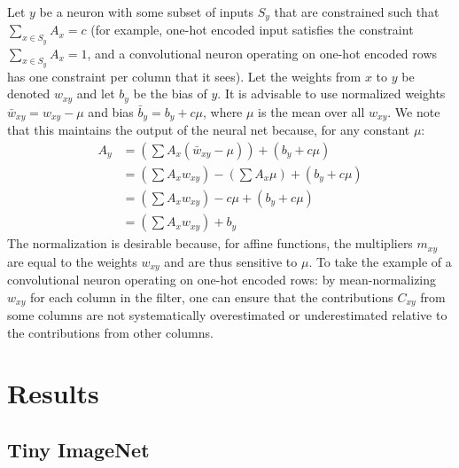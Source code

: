 \documentclass{article}
\begin{document}
Let $y$ be a neuron with some subset of inputs $S_y$ that are constrained such that $\sum_{x \in S_y} A_x=c$ (for example, one-hot encoded input satisfies the constraint $\sum_{x \in S_y} A_x = 1$, and a convolutional neuron operating on one-hot encoded rows has one constraint per column that it sees). Let the weights from $x$ to $y$ be denoted $w_{xy}$ and let $b_y$ be the bias of $y$. It is advisable to use normalized weights $\bar{w}_{xy} = w_{xy} - \mu$ and bias $\bar{b}_y = b_y + c\mu$, where $\mu$ is the mean over all $w_{xy}$. We note that this maintains the output of the neural net because, for any constant $\mu$:
\begin{equation}
\begin{aligned}
A_y &= \left(\sum A_x (\bar{w}_{xy} - \mu) \right) + (b_y + c\mu)\\
	&= \left(\sum A_x w_{xy}\right) - \left(\sum A_x \mu\right) + (b_y + c\mu)\\
    &= \left(\sum A_x w_{xy}\right) - c\mu + (b_y + c\mu)\\
    &= \left(\sum A_x w_{xy}\right) + b_y
\end{aligned}
\end{equation}
The normalization is desirable because, for affine functions, the multipliers $m_{xy}$ are equal to the weights $w_{xy}$ and are thus sensitive to $\mu$. To take the example of a convolutional neuron operating on one-hot encoded rows: by mean-normalizing $w_{xy}$ for each column in the filter, one can ensure that the contributions $C_{xy}$ from some columns are not systematically overestimated or underestimated relative to the contributions from other columns.

\section{Results}

\subsection{Tiny ImageNet}
\end{document}
